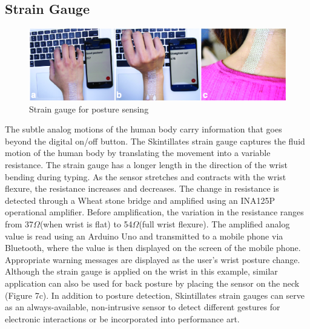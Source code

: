 \documentclass{sigchi}
\begin{document}
\subsection {Strain Gauge}
\begin{figure}
\centering
\includegraphics[width=1.0\textwidth]{figures/Figure10}
\caption{Strain gauge for posture sensing}
\vspace{-8pt}
\label{fig:straingauge}
\end{figure}
The subtle analog motions of the human body carry information that goes beyond the digital on/off button. The Skintillates strain gauge captures the fluid motion of the human body by translating the movement into a variable resistance. 
 The strain gauge has a longer length in the direction of the wrist bending during typing. As the sensor stretches and contracts with the wrist flexure, the resistance increases and decreases. The change in resistance is detected through a Wheat stone bridge and amplified using an INA125P operational amplifier. Before amplification, the variation in the resistance ranges from 37$\Omega$(when wrist is flat) to 54$\Omega$(full wrist flexure). The amplified analog value is read using an Arduino Uno and transmitted to a mobile phone via Bluetooth, where the value is then displayed on the screen of the mobile phone. Appropriate warning messages are displayed as the user’s wrist posture change. Although the strain gauge is applied on the wrist in this example, similar application can also be used for back posture by placing the sensor on the neck (Figure 7c). In addition to posture detection, Skintillates strain gauges can serve as an always-available, non-intrusive sensor to detect different gestures for electronic interactions or be incorporated into performance art. 
\end{document}
